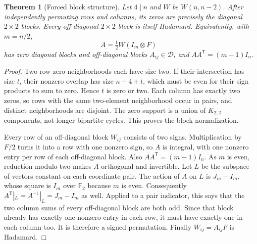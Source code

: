 \documentclass[11pt]{article}
\newtheorem{theorem}{Theorem}[section]
\begin{document}
\begin{theorem}[Forced block structure]
Let $4\mid n$ and $W$ be $W(n,n-2)$. After independently permuting
rows and columns, its zeros are precisely the diagonal $2\times2$
blocks. Every off-diagonal $2\times2$ block is itself Hadamard.
Equivalently, with $m=n/2$,
\[
 A=\tfrac12W(I_m\otimes F)
\]
has zero diagonal blocks and off-diagonal blocks $A_{ij}\in\mathcal D$,
and $AA^{\mathsf T}=(m-1)I_n$.
\end{theorem}
\begin{proof}
Two row zero-neighborhoods each have size two. If their intersection
has size $t$, their nonzero overlap has size $n-4+t$, which must be
even for their sign products to sum to zero. Hence $t$ is zero or
two. Each column has exactly two zeros, so rows with the same
two-element neighborhood occur in pairs, and distinct neighborhoods
are disjoint. The zero support is a union of $K_{2,2}$ components,
not longer bipartite cycles. This proves the block normalization.

Every row of an off-diagonal block $W_{ij}$ consists of two signs.
Multiplication by $F/2$ turns it into a row with one nonzero sign,
so $A$ is integral, with one nonzero entry per row of each
off-diagonal block. Also $AA^{\mathsf T}=(m-1)I_n$.
As $m$ is even, reduction modulo two makes $A$ orthogonal and
invertible. Let $L$ be the subspace of vectors constant on each
coordinate pair. The action of $A$ on $L$ is $J_m-I_m$, whose
square is $I_m$ over $\mathbb F_2$ because $m$ is even.
Consequently $A^{\mathsf T}|_L=A^{-1}|_L=J_m-I_m$ as well.
Applied to a pair indicator, this says that the two column sums
of every off-diagonal block are both odd. Since that block already
has exactly one nonzero entry in each row, it must have exactly
one in each column too. It is therefore a signed permutation.
Finally $W_{ij}=A_{ij}F$ is Hadamard.
\end{proof}
\end{document}
